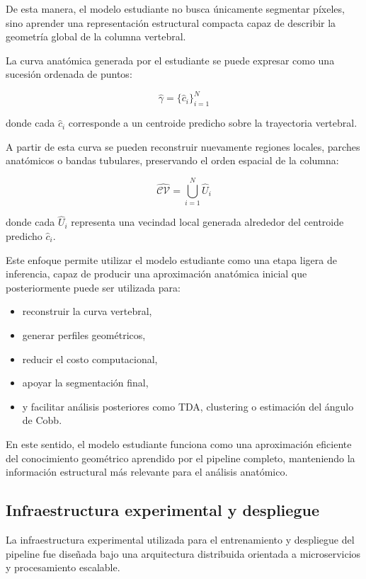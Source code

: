 \documentclass[conference]{IEEEtran}
\begin{document}
De esta manera, el modelo estudiante no busca únicamente segmentar píxeles, sino aprender una representación estructural compacta capaz de describir la geometría global de la columna vertebral.

La curva anatómica generada por el estudiante se puede expresar como una sucesión ordenada de puntos:

\[
\hat{\gamma}=\{\hat{c}_i\}_{i=1}^{N}
\]

donde cada \(\hat{c}_i\) corresponde a un centroide predicho sobre la trayectoria vertebral.

A partir de esta curva se pueden reconstruir nuevamente regiones locales, parches anatómicos o bandas tubulares, preservando el orden espacial de la columna:

\[
\hat{\mathcal{CV}}
=
\bigcup_{i=1}^{N} \hat{U}_i
\]

donde cada \(\hat{U}_i\) representa una vecindad local generada alrededor del centroide predicho \(\hat{c}_i\).

Este enfoque permite utilizar el modelo estudiante como una etapa ligera de inferencia, capaz de producir una aproximación anatómica inicial que posteriormente puede ser utilizada para:

\begin{itemize}
    \item reconstruir la curva vertebral,
    \item generar perfiles geométricos,
    \item reducir el costo computacional,
    \item apoyar la segmentación final,
    \item y facilitar análisis posteriores como TDA, clustering o estimación del ángulo de Cobb.
\end{itemize}

En este sentido, el modelo estudiante funciona como una aproximación eficiente del conocimiento geométrico aprendido por el pipeline completo, manteniendo la información estructural más relevante para el análisis anatómico.

\subsection{Infraestructura experimental y despliegue}

La infraestructura experimental utilizada para el entrenamiento y despliegue del pipeline fue diseñada bajo una arquitectura distribuida orientada a microservicios y procesamiento escalable.
\end{document}
